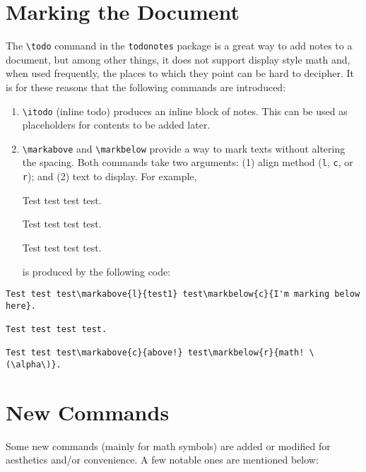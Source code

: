 \documentclass[10pt,letterpaper]{amsart}
\begin{document}
\section{Marking the Document}
\label{sec:marking}
The \verb|\todo| command in the \verb|todonotes| package is a great way to add notes to a document, but among other things, it does not support display style math and, when used frequently, the places to which they point can be hard to decipher. 
It is for these reasons that the following commands are introduced:
\begin{enumerate}[label=(\alph*)]
  \item \verb|\itodo| (inline todo) produces an inline block of notes. 
    This can be used as placeholders for contents to be added later. 
  \item \verb|\markabove| and \verb|\markbelow| provide a way to mark texts without altering the spacing. 
  Both commands take two arguments: (1) align method (\verb|l|, \verb|c|, or \verb|r|); and (2) text to display. 
  For example, 

  \begin{mdframed}
    \noindent
    Test test test test.

    \noindent
    Test test test test.

    \noindent
    Test test test test.
  \end{mdframed}
  is produced by the following code:
\end{enumerate}
\begin{verbatim}
Test test test\markabove{l}{test1} test\markbelow{c}{I'm marking below here}.

Test test test test.

Test test test\markabove{c}{above!} test\markbelow{r}{math! \(\alpha\)}.
\end{verbatim}




\section{New Commands}
Some new commands (mainly for math symbols) are added or modified for aesthetics and/or convenience.
A few notable ones are mentioned below:
\end{document}
